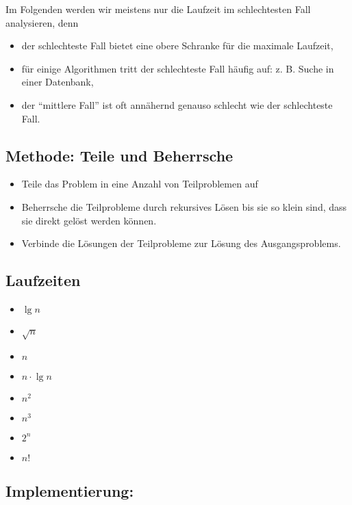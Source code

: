 \documentclass[a4paper,twoside,DIV15,BCOR12mm]{scrbook}
\begin{document}
Im Folgenden werden wir meistens nur die Laufzeit im schlechtesten Fall analysieren, denn
\begin{itemize}
	\item der schlechteste Fall bietet eine obere Schranke für die maximale Laufzeit,
	\item für einige Algorithmen tritt der schlechteste Fall häufig auf: z. B. Suche in einer Datenbank,
	\item der "`mittlere Fall"' ist oft annähernd genauso schlecht wie der schlechteste Fall.
\end{itemize}

\subsection{Methode: Teile und Beherrsche}
\begin{itemize}
	\item Teile das Problem in eine Anzahl von Teilproblemen auf
	\item Beherrsche die Teilprobleme durch rekursives Lösen bis sie so klein sind, dass sie direkt gelöst werden können.
	\item Verbinde die Lösungen der Teilprobleme zur Lösung des Ausgangsproblems.
\end{itemize}

\subsection{Laufzeiten}
\begin{itemize}
	\item $\lg n$
	\item $\sqrt{n}$
	\item $n$
	\item $n\cdot\lg n$
	\item $n^2$
	\item $n^3$
	\item $2^n$
	\item $n!$
\end{itemize}


\subsection{Implementierung: }
\end{document}
